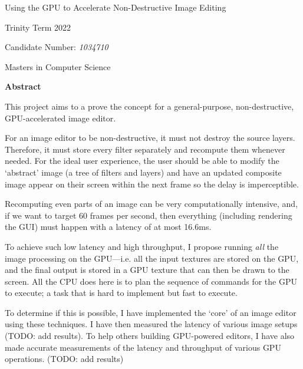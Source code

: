 \documentclass[12pt]{article}
\begin{document}
\begin{titlepage}
    \begin{center}
        \vspace*{1.5in}

        \Huge
        Using the GPU to Accelerate Non-Destructive Image Editing

        \vspace*{2in}

        \Large

        Trinity Term 2022

        \vspace*{0.25in}
        Candidate Number: \emph{1034710}

        \vspace*{0.25in}
        Masters in Computer Science
    \end{center}
\end{titlepage}



\begin{center}
    \large \textbf{Abstract}
\end{center}

This project aims to a prove the concept for a general-purpose, non-destructive, GPU-accelerated
image editor.

For an image editor to be non-destructive, it must not destroy the source layers.  Therefore, it
must store every filter separately and recompute them whenever needed.  For the ideal user
experience, the user should be able to modify the `abstract' image (a tree of filters and layers)
and have an updated composite image appear on their screen within the next frame so the delay is
imperceptible.

Recomputing even parts of an image can be very computationally intensive, and, if we want to target
60 frames per second, then everything (including rendering the GUI) must happen with a latency of at
most 16.6ms.

To achieve such low latency and high throughput, I propose running \emph{all} the
image processing on the GPU---i.e. all the input textures are stored on the GPU, and the final
output is stored in a GPU texture that can then be drawn to the screen.  All the CPU does here is to
plan the sequence of commands for the GPU to execute; a task that is hard to implement but fast to
execute.

To determine if this is possible, I have implemented the `core' of an image editor using these
techniques.  I have then measured the latency of various image setups (TODO: add results).  To help
others building GPU-powered editors, I have also made accurate measurements of the latency and
throughput of various GPU operations.  (TODO: add results)
\end{document}

